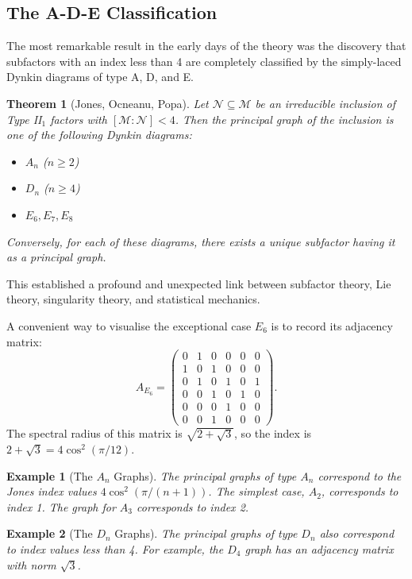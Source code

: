 \documentclass[11pt, a4paper]{article}
\theoremstyle{colored_def}
\theoremstyle{colored_thm}
\newtheorem{theorem}{Theorem}[section]
\theoremstyle{colored_ex}
\newtheorem{example}{Example}[section]
\newcommand{\M}{\mathcal{M}}
\newcommand{\N}{\mathcal{N}}
\begin{document}
\subsection{The A-D-E Classification}

The most remarkable result in the early days of the theory was the discovery that subfactors with an index less than 4 are completely classified by the simply-laced Dynkin diagrams of type A, D, and E.

\begin{theorem}[Jones, Ocneanu, Popa]
Let $\N \subseteq \M$ be an irreducible inclusion of Type II$_1$ factors with $[\M : \N] < 4$. Then the principal graph of the inclusion is one of the following Dynkin diagrams:
\begin{itemize}
    \item $A_n$ ($n \geq 2$)
    \item $D_n$ ($n \geq 4$)
    \item $E_6, E_7, E_8$
\end{itemize}
Conversely, for each of these diagrams, there exists a unique subfactor having it as a principal graph.
\end{theorem}

This established a profound and unexpected link between subfactor theory, Lie theory, singularity theory, and statistical mechanics.

A convenient way to visualise the exceptional case $E_6$ is to record its adjacency matrix:
\[
A_{E_6} = \begin{pmatrix}
    0 & 1 & 0 & 0 & 0 & 0 \\
    1 & 0 & 1 & 0 & 0 & 0 \\
    0 & 1 & 0 & 1 & 0 & 1 \\
    0 & 0 & 1 & 0 & 1 & 0 \\
    0 & 0 & 0 & 1 & 0 & 0 \\
    0 & 0 & 1 & 0 & 0 & 0
\end{pmatrix}.
\]
The spectral radius of this matrix is $\sqrt{2+\sqrt{3}}$, so the index is $2+\sqrt{3} = 4\cos^2(\pi/12)$.


\begin{example}[The $A_n$ Graphs]
The principal graphs of type $A_n$ correspond to the Jones index values $4\cos^2(\pi/(n+1))$. The simplest case, $A_2$, corresponds to index 1. The graph for $A_3$ corresponds to index 2.
\end{example}

\begin{example}[The $D_n$ Graphs]
The principal graphs of type $D_n$ also correspond to index values less than 4. For example, the $D_4$ graph has an adjacency matrix with norm $\sqrt{3}$.
\end{example}
\end{document}
